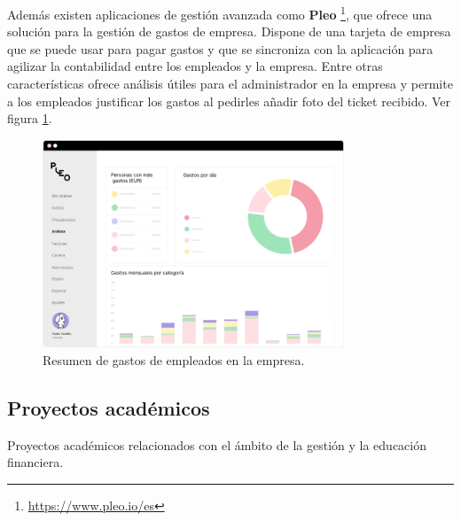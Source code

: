 Además existen aplicaciones de gestión avanzada como \textbf{Pleo} 
\footnote{\url{https://www.pleo.io/es}}, que ofrece una solución para la gestión 
de gastos de empresa. Dispone de una tarjeta 
de empresa que se puede usar para pagar gastos y que se sincroniza con la aplicación 
para agilizar la contabilidad entre los empleados y la empresa. 
Entre otras características ofrece análisis útiles para el administrador en la empresa 
y permite a los empleados justificar los gastos al pedirles añadir foto del ticket recibido. 
Ver figura \ref{fig:resumen_gastos_pleo}.
\begin{figure}[ht!]
    \centering
    \includegraphics[width = 90mm]{imagenes/resumen-gastos-pleo.png}
    \caption{Resumen de gastos de empleados en la empresa.}
    \label{fig:resumen_gastos_pleo}
\end{figure}


\subsection{Proyectos académicos}
Proyectos académicos relacionados con el ámbito de la gestión y la educación financiera.

